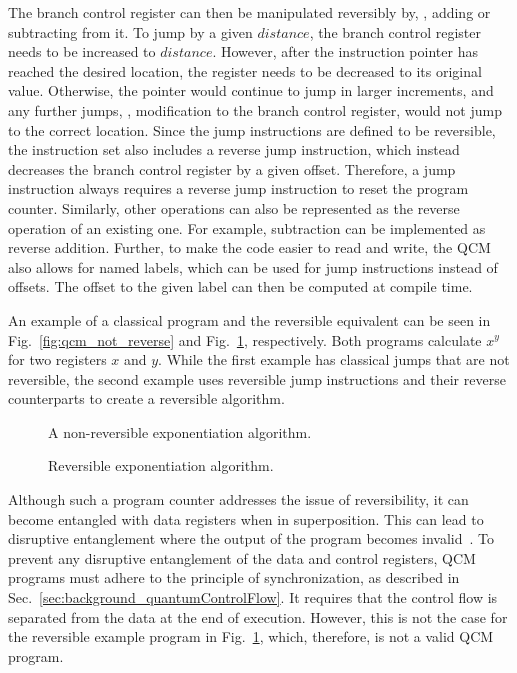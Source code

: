 The branch control register can then be manipulated reversibly by, \eg, adding or subtracting from it. To jump by a given $distance$, the branch control register needs to be increased to $distance$. However, after the instruction pointer has reached the desired location, the register needs to be decreased to its original value. Otherwise, the pointer would continue to jump in larger increments, and any further jumps, \ie, modification to the branch control register, would not jump to the correct location. Since the jump instructions are defined to be reversible, the instruction set also includes a reverse jump instruction, which instead decreases the branch control register by a given offset. Therefore, a jump instruction always requires a reverse jump instruction to reset the program counter. Similarly, other operations can also be represented as the reverse operation of an existing one. For example, subtraction can be implemented as reverse addition. Further, to make the code easier to read and write, the QCM also allows for named labels, which can be used for jump instructions instead of offsets. The offset to the given label can then be computed at compile time. 

An example of a classical program and the reversible equivalent can be seen in Fig.~\ref{fig:qcm_not_reverse} and Fig.~\ref{fig:qcm_reverse}, respectively. Both programs calculate $x^y$ for two registers $x$ and $y$. While the first example has classical jumps that are not reversible, the second example uses reversible jump instructions and their reverse counterparts to create a reversible algorithm.

\begin{figure}[htp]
    \centering     
    \begin{minipage}{.40\textwidth}
        
        \caption{A non-reversible exponentiation algorithm.}
        \label{fig:qcm_not_reverse}
    \end{minipage}
    \hfill
    \begin{minipage}{.50\textwidth}
        
        \caption{Reversible exponentiation algorithm.}    
        \label{fig:qcm_reverse}
    \end{minipage}
\end{figure}

Although such a program counter addresses the issue of reversibility, it can become entangled with data registers when in superposition. This can lead to disruptive entanglement where the output of the program becomes invalid~\cite{YVC24}. To prevent any disruptive entanglement of the data and control registers, QCM programs must adhere to the principle of synchronization, as described in Sec.~\ref{sec:background_quantumControlFlow}. 
It requires that the control flow is separated from the data at the end of execution. However, this is not the case for the reversible example program in Fig.~\ref{fig:qcm_reverse}, which, therefore, is not a valid QCM program.

